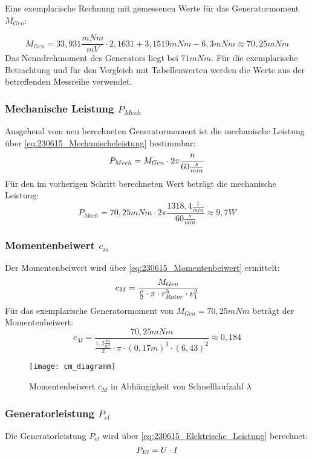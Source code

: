 Eine exemplarische Rechnung mit gemessenen Werte für das Generatormoment $M_{Gen}$:

$$M_{Gen} = 33,931\frac{mNm}{mV} \cdot 2,1631 + 3,1519 mNm - 6,3mNm \approx 70,25 mNm$$
Das Nenndrehmoment des Generators liegt bei $71 mNm$. Für die exemplarische Betrachtung und für den Vergleich mit Tabellenwerten werden die Werte aus der betreffenden Messreihe verwendet.
\subsubsection*{Mechanische Leistung $P_{Mech}$}
Ausgehend vom neu berechneten Generatormoment ist die mechanische Leistung über \autoref{eq:230615_Mechanischeleistung} bestimmbar:
\begin{equation}
    \centering
    P_{Mech} = M_{Gen} \cdot 2 \pi \frac{n}{60\frac{s}{min}}
    \label{eq:230615_Mechanischeleistung}
\end{equation}
Für den im vorherigen Schritt berechneten Wert beträgt die mechanische Leistung: 
$$P_{Mech} = 70,25mNm \cdot 2 \pi \frac{1318,4 \frac{1}{min}}{60\frac{s}{min}} \approx 9,7W$$
\newpage
\subsubsection*{Momentenbeiwert $c_m$}
Der Momentenbeiwert wird über \autoref{eq:230615_Momentenbeiwert} ermittelt:
\begin{equation}
    \centering
    c_M = \frac{M_{Gen}}{ \frac{\rho}{2} \cdot \pi \cdot r_{Rotor}^3 \cdot v_1^2}
    \label{eq:230615_Momentenbeiwert}
\end{equation}
Für das exemplarische Generatormoment von $M_{Gen} = 70,25mNm$ beträgt der Momentenbeiwert:
$$c_M = \frac{70,25mNm}{ \frac{1,2 \frac{kg}{m^3}}{2} \cdot \pi \cdot (0,17 m)^3 \cdot (6,43)^2}\approx 0,184$$

\begin{figure}[H]
    \centering
    \texttt{[image: cm\_diagramm]}
    \caption{Momentenbeiwert $c_M$ in Abhängigkeit von Schnelllaufzahl $\lambda$}
    \label{fig:Momentenbeiwert}
\end{figure}

\subsubsection*{Generatorleistung $P_{el}$}
Die Generatorleistung $P_{el}$ wird über \autoref{eq:230615_Elektrische_Leistung} berechnet:
\begin{equation}
    \centering
    P_{El} = U \cdot I
    \label{eq:230615_Elektrische_Leistung}
\end{equation}


